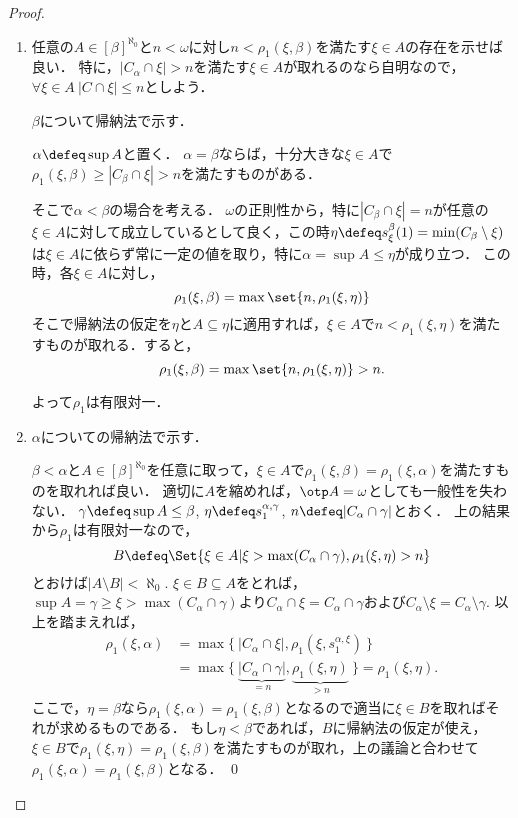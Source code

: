 \documentclass[a4j]{ltjsarticle}
\begin{document}
\begin{proof}
 \begin{enumerate}
  \item 任意の$A \in [\beta]^{\aleph_0}$と$n < \omega$に対し$n < \rho_1(\xi, \beta)$を満たす$\xi \in A$の存在を示せば良い．
        特に，$|C_\alpha \cap \xi| > n$を満たす$\xi \in A$が取れるのなら自明なので，$\forall \xi \in A \: |C \cap \xi| \leq n$としよう．

        $\beta$について帰納法で示す．

        $\alpha \defeq \sup A$と置く．
        $\alpha = \beta$ならば，十分大きな$\xi \in A$で$\rho_1(\xi, \beta) \geq |C_\beta \cap \xi| > n$を満たすものがある．

        そこで$\alpha < \beta$の場合を考える．
        $\omega$の正則性から，特に$|C_\beta \cap \xi| = n$が任意の$\xi \in A$に対して成立しているとして良く，この時$\eta \defeq s^{\beta}_\xi(1) = \min(C_\beta \setminus \xi)$は$\xi \in A$に依らず常に一定の値を取り，特に$\alpha = \sup A \leq \eta$が成り立つ．
        この時，各$\xi \in A$に対し，
        \[
         \rho_1(\xi, \beta) = \max \set{ n, \rho_1(\xi, \eta) }
        \]
         そこで帰納法の仮定を$\eta$と$A \subseteq \eta$に適用すれば，$\xi \in A$で$n < \rho_1(\xi, \eta)$を満たすものが取れる．すると，
        \[
         \rho_1(\xi, \beta) = \max\set{n, \rho_1(\xi, \eta)} > n.
        \]

        よって$\rho_1$は有限対一．
  \item $\alpha$についての帰納法で示す．

        $\beta < \alpha$と$A \in [\beta]^{\aleph_0}$を任意に取って，$\xi \in A$で$\rho_1(\xi, \beta) = \rho_1(\xi, \alpha)$を満たすものを取れれば良い．
        適切に$A$を縮めれば，$\otp A = \omega$としても一般性を失わない．
        $\gamma \defeq \sup A \leq \beta$, $\eta \defeq s^{\alpha,\gamma}_1$, $n \defeq |C_\alpha \cap \gamma|$とおく．
        上の結果から$\rho_1$は有限対一なので，
        \[
         B \defeq \Set{\xi \in A | \xi > \max(C_\alpha \cap \gamma), \rho_1(\xi, \eta) > n }
        \]
        とおけば$|A \setminus B| < \aleph_0$.
        $\xi \in B \subseteq A$をとれば，$\sup A = \gamma \geq \xi > \max(C_\alpha \cap \gamma)$より$C_\alpha \cap \xi = C_\alpha \cap \gamma$および$C_\alpha \setminus \xi = C_\alpha \setminus \gamma$.
        以上を踏まえれば，
        \begin{align*}
         \rho_1(\xi, \alpha) &= \max \{\ |C_\alpha \cap \xi|, \rho_1(\xi, s^{\alpha,\xi}_1) \ \}\\
         &= \max \{\ \underbrace{|C_\alpha \cap \gamma |}_{= n}, \underbrace{\rho_1(\xi, \eta)}_{> n} \ \} = \rho_1(\xi, \eta).
        \end{align*}
        ここで，$\eta = \beta$なら$\rho_1(\xi, \alpha) = \rho_1(\xi, \beta)$となるので適当に$\xi \in B$を取ればそれが求めるものである．
        もし$\eta < \beta$であれば，$B$に帰納法の仮定が使え，$\xi \in B$で$\rho_1(\xi, \eta) = \rho_1(\xi, \beta)$を満たすものが取れ，上の議論と合わせて$\rho_1(\xi, \alpha) = \rho_1(\xi, \beta)$となる． \qed
 \end{enumerate}
\end{proof}
\end{document}
